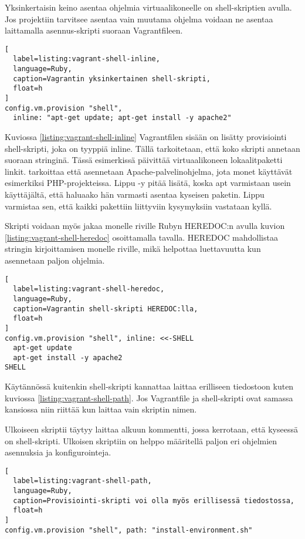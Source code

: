 Yksinkertaisin keino asentaa ohjelmia virtuaalikoneelle on shell-skriptien avulla. Jos projektiin tarvitsee asentaa vain muutama ohjelma voidaan ne asentaa laittamalla asennus-skripti suoraan Vagrantfileen. 

\begin{lstlisting}[
  label=listing:vagrant-shell-inline,
  language=Ruby,
  caption=Vagrantin yksinkertainen shell-skripti,
  float=h
]
config.vm.provision "shell",
  inline: "apt-get update; apt-get install -y apache2"
\end{lstlisting}

Kuviossa \ref{listing:vagrant-shell-inline} Vagrantfilen sisään on lisätty provisiointi shell-skripti, joka on tyyppiä inline. Tällä tarkoitetaan, että koko skripti annetaan suoraan stringinä. Tässä esimerkissä  päivittää virtuaalikoneen lokaalitpaketti linkit.  tarkoittaa että asennetaan Apache-palvelinohjelma, jota monet käyttävät esimerkiksi PHP-projekteissa. Lippu -y pitää lisätä, koska apt varmistaan usein käyttäjältä, että haluaako hän varmasti asentaa kyseisen paketin. Lippu varmistaa sen, että kaikki pakettiin liittyviin kysymyksiin vastataan kyllä.

Skripti voidaan myös jakaa monelle riville Rubyn HEREDOC:n avulla kuvion \ref{listing:vagrant-shell-heredoc} osoittamalla tavalla. HEREDOC \cite{link:ruby-heredoc} mahdollistaa stringin kirjoittamisen monelle riville, mikä helpottaa luettavuutta kun asennetaan paljon ohjelmia.

\begin{lstlisting}[
  label=listing:vagrant-shell-heredoc,
  language=Ruby,
  caption=Vagrantin shell-skripti HEREDOC:lla,
  float=h
]
config.vm.provision "shell", inline: <<-SHELL
  apt-get update
  apt-get install -y apache2
SHELL
\end{lstlisting}

Käytännössä kuitenkin shell-skripti kannattaa laittaa erilliseen tiedostoon kuten kuviossa \ref{listing:vagrant-shell-path}. Jos Vagrantfile ja shell-skripti ovat samassa kansiossa niin riittää kun laittaa vain skriptin nimen.

Ulkoiseen skriptii täytyy laittaa alkuun kommentti, jossa kerrotaan, että kyseessä on shell-skripti. Ulkoisen skriptiin on helppo määritellä paljon eri ohjelmien asennuksia ja konfigurointeja.

\begin{lstlisting}[
  label=listing:vagrant-shell-path,
  language=Ruby,
  caption=Provisiointi-skripti voi olla myös erillisessä tiedostossa,
  float=h
]
config.vm.provision "shell", path: "install-environment.sh"
\end{lstlisting}

